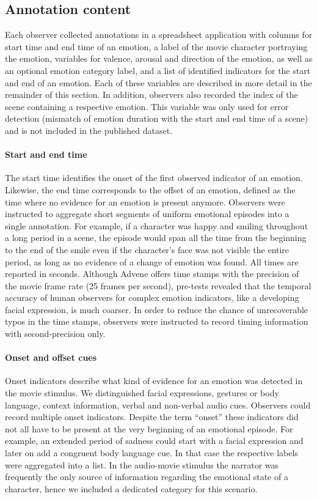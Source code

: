 \documentclass[10pt,a4paper,twocolumn]{article}
\begin{document}
\subsection*{Annotation content}

Each observer collected annotations in a spreadsheet application with columns
for start time and end time of an emotion, a label of the movie character
portraying the emotion, variables for valence, arousal and direction of the
emotion, as well as an optional emotion category label, and a list of
identified indicators for the start and end of an emotion. Each of these
variables are described in more detail in the remainder of this section. In
addition, observers also recorded the index of the scene containing a
respective emotion. This variable was only used for error detection (mismatch
of emotion duration with the start and end time of a scene) and is not included
in the published dataset.

\paragraph{Start and end time}

The start time identifies the onset of the first observed indicator of an
emotion. Likewise, the end time corresponds to the offset of an emotion,
defined as the time where no evidence for an emotion is present anymore.
Observers were instructed to aggregate short segments of uniform emotional
episodes into a single annotation. For example, if a character was happy and
smiling throughout a long period in a scene, the episode would span all the
time from the beginning to the end of the smile even if the character's face
was not visible the entire period, as long as no evidence of a change of
emotion was found.  All times are reported in seconds. Although Advene offers
time stamps with the precision of the movie frame rate (25 frames per second),
pre-tests revealed that the temporal accuracy of human observers for complex
emotion indicators, like a developing facial expression, is much coarser. In
order to reduce the chance of unrecoverable typos in the time stamps, observers
were instructed to record timing information with second-precision only.

\paragraph{Onset and offset cues}

Onset indicators describe what kind of evidence for an emotion was detected in
the movie stimulus. We distinguished facial expressions, gestures or body
language, context information, verbal and non-verbal audio cues. Observers
could record multiple onset indicators. Despite the term ``onset'' these
indicators did not all have to be present at the very beginning of an emotional
episode. For example, an extended period of sadness could start with a facial
expression and later on add a congruent body language cue. In that case the
respective labels were aggregated into a list. In the audio-movie stimulus the
narrator was frequently the only source of information regarding the emotional
state of a character, hence we included a dedicated category for this scenario.
\end{document}
